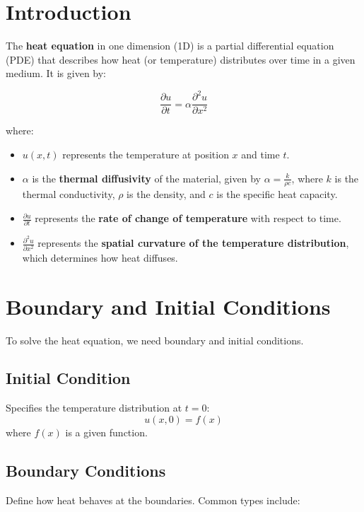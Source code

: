 \section{Introduction}
The \textbf{heat equation} in one dimension (1D) is a partial differential equation (PDE) that describes how heat (or temperature) distributes over time in a given medium. It is given by:

\begin{equation}
\frac{\partial u}{\partial t} = \alpha \frac{\partial^2 u}{\partial x^2}
\end{equation}

where:
\begin{itemize}
    \item $u(x,t)$ represents the temperature at position $x$ and time $t$.
    \item $\alpha$ is the \textbf{thermal diffusivity} of the material, given by $\alpha = \frac{k}{\rho c}$, where $k$ is the thermal conductivity, $\rho$ is the density, and $c$ is the specific heat capacity.
    \item $\frac{\partial u}{\partial t}$ represents the \textbf{rate of change of temperature} with respect to time.
    \item $\frac{\partial^2 u}{\partial x^2}$ represents the \textbf{spatial curvature of the temperature distribution}, which determines how heat diffuses.
\end{itemize}

\section{Boundary and Initial Conditions}
To solve the heat equation, we need boundary and initial conditions.

\subsection{Initial Condition}
Specifies the temperature distribution at $t = 0$:
\begin{equation}
    u(x, 0) = f(x)
\end{equation}
where $f(x)$ is a given function.

\subsection{Boundary Conditions}
Define how heat behaves at the boundaries. Common types include:

